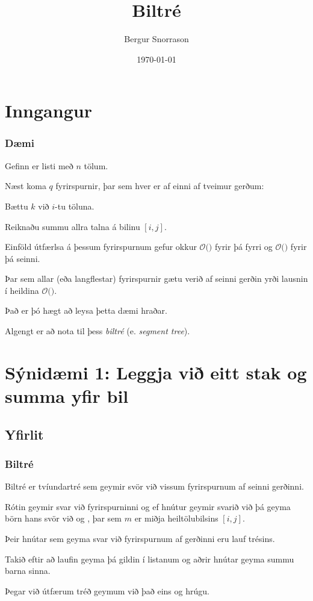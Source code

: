 \title{Biltré}
\author{Bergur Snorrason}
\date{\today}



\frame{\titlepage}

\section{Inngangur}
{
    \frametitle{Dæmi}
    {
        \item<1-> Gefinn er listi með $n$ tölum.
        \item<2-> Næst koma $q$ fyrirspurnir, þar sem hver er af einni af tveimur gerðum:
        {
            \item<3-> Bættu $k$ við $i$-tu töluna.
            \item<4-> Reiknaðu summu allra talna á bilinu $[i, j]$.
        }
        \item<5-> Einföld útfærlsa á þessum fyrirspurnum gefur okkur
                    $\mathcal{O}($$)$ fyrir þá fyrri og
                    $\mathcal{O}($$)$ fyrir þá seinni.
        \item<8-> Þar sem allar (eða langflestar) fyrirspurnir gætu verið af seinni gerðin yrði lausnin í heildina
                    $\mathcal{O}($$)$.
        \item<10-> Það er þó hægt að leysa þetta dæmi hraðar.
        \item<11-> Algengt er að nota til þess \emph{biltré} (e. \emph{segment tree}).
    }
}

\section{Sýnidæmi 1: Leggja við eitt stak og summa yfir bil}
\subsection{Yfirlit}
{
    \frametitle{Biltré}
    {
        \item<1-> Biltré er tvíundartré sem geymir svör við vissum fyrirspurnum af seinni gerðinni.
        \item<2-> Rótin geymir svar við fyrirspurninni  
                    og ef hnútur geymir svarið við  þá geyma börn hans svör við 
                    og , þar sem $m$ er miðja heiltölubilsins $[i, j]$.
        \item<3-> Þeir hnútar sem geyma svar við fyrirspurnum af gerðinni  eru lauf trésins.
        \item<4-> Takið eftir að laufin geyma þá gildin í listanum og aðrir hnútar geyma summu barna sinna.
        \item<5-> Þegar við útfærum tréð geymum við það eins og hrúgu.
    }
}

